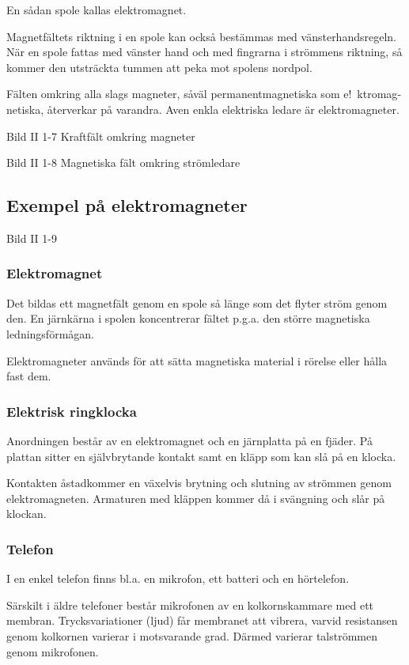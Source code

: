 En sådan spole kallas elektromagnet.

Magnetfältets riktning i en spole kan också bestämmas med vänsterhandsregeln.
När en spole fattas med vänster hand och med fingrarna i strömmens riktning, så
kommer den utsträckta tummen att peka mot spolens nordpol.

Fälten omkring alla slags magneter, såväl permanentmagnetiska som e!~ktromag­
netiska, återverkar på varandra. Aven enkla
elektriska ledare är elektromagneter.

Bild II 1-7 Kraftfält omkring magneter

Bild II 1-8 Magnetiska fält omkring strömledare

\subsection{Exempel på elektromagneter}

Bild II 1-9

\subsubsection{Elektromagnet}
Det bildas ett magnetfält genom en spole så länge som det flyter ström genom den. En
järnkärna i spolen koncentrerar fältet p.g.a. den större magnetiska ledningsförmågan.

Elektromagneter används för att sätta magnetiska material i rörelse eller hålla fast
dem.

\subsubsection{Elektrisk ringklocka}
Anordningen består av en elektromagnet och en järnplatta på en fjäder. På plattan
sitter en självbrytande kontakt samt en kläpp som kan slå på en klocka.

Kontakten åstadkommer en växelvis brytning och slutning av strömmen genom
elektromagneten. Armaturen med kläppen kommer då i svängning och slår på klockan.

\subsubsection{Telefon}
I en enkel telefon finns bl.a. en mikrofon, ett batteri och en hörtelefon.

Särskilt i äldre telefoner består mikrofonen av en kolkornskammare med ett membran.
Trycksvariationer (ljud) får membranet att vibrera, varvid resistansen genom kolkornen
varierar i motsvarande grad. Därmed varierar talströmmen genom mikrofonen.


